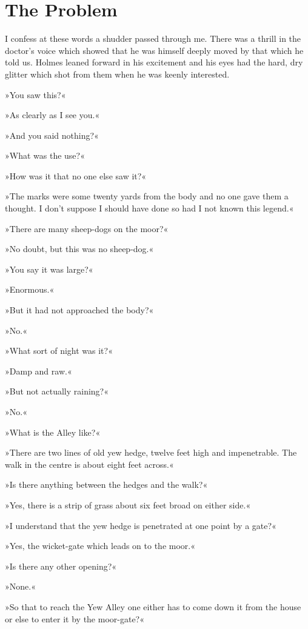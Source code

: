\chapter{The Problem}
\lettrine[lines=4]{I}{} confess at these words a shudder passed through me. There was a thrill in the doctor's voice which showed that he was himself deeply moved by that which he told us. Holmes leaned forward in his excitement and his eyes had the hard, dry glitter which shot from them when he was keenly interested.

»You saw this?«

»As clearly as I see you.«

»And you said nothing?«

»What was the use?«

»How was it that no one else saw it?«

»The marks were some twenty yards from the body and no one gave them a thought. I don't suppose I should have done so had I not known this legend.«

»There are many sheep-dogs on the moor?«

»No doubt, but this was no sheep-dog.«

»You say it was large?«

»Enormous.«

»But it had not approached the body?«

»No.«

»What sort of night was it?«

»Damp and raw.«

»But not actually raining?«

»No.«

»What is the Alley like?«

»There are two lines of old yew hedge, twelve feet high and impenetrable. The walk in the centre is about eight feet across.«

»Is there anything between the hedges and the walk?«

»Yes, there is a strip of grass about six feet broad on either side.«

»I understand that the yew hedge is penetrated at one point by a gate?«

»Yes, the wicket-gate which leads on to the moor.«

»Is there any other opening?«

»None.«

»So that to reach the Yew Alley one either has to come down it from the house or else to enter it by the moor-gate?«

